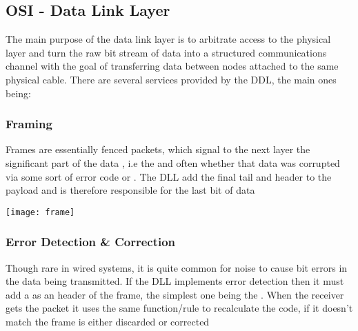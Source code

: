 \subsection{OSI - Data Link Layer}

	\par{The main purpose of the data link layer is to arbitrate access to the physical layer and turn the raw bit stream of data into a structured communications channel with the goal of transferring data between nodes attached to the same physical cable. There are several services provided by the DDL, the main ones being: }


	\subsubsection{Framing}

		\par{Frames are essentially fenced packets, which signal to the next layer the significant part of the data , i.e the  and often whether that data was corrupted via some sort of error code or . The DLL add the final tail and header to the payload and is therefore responsible for the last bit of data }

		\texttt{[image: frame]}


	\subsubsection{Error Detection \& Correction}

		\par{Though rare in wired systems, it is quite common for noise to cause bit errors in the data being transmitted. If the DLL implements error detection then it must add a  as an header of the frame, the simplest one being the . When the receiver gets the packet it uses the same function/rule to recalculate the code, if it doesn't match the frame is either discarded or corrected}



